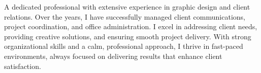 \documentclass[10pt,a4paper,ragged2e,withhyper]{altacv}
\begin{document}



\makecvheader


\begin{raggedright}
  A dedicated professional with extensive experience in graphic design and client relations. Over the years, I have successfully managed client communications, project coordination, and office administration. I excel in addressing client needs, providing creative solutions, and ensuring smooth project delivery. With strong organizational skills and a calm, professional approach, I thrive in fast-paced environments, always focused on delivering results that enhance client satisfaction.
\end{raggedright}

\vspace{0.5cm}

















    
    
\end{document}
